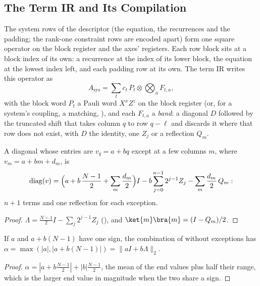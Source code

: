 \subsection{The Term IR and Its Compilation}
\label{app:term-ir}

The system rows of the descriptor (the equation, the recurrences and the padding; the rank-one constraint rows are encoded apart) form one square operator on the block register and the axes' registers. Each row block sits at a block index of its own: a recurrence at the index of its lower block, the equation at the lowest index left, and each padding row at its own. The term IR writes this operator as
\begin{equation}
    A_{\mathrm{sys}}=\sum_tc_t\,P_t\otimes\bigotimes_aF_{t,a},
    \label{eq:app-term-ir}
\end{equation}
with the block word $P_t$ a Pauli word $X^xZ^z$ on the block register (or, for a system's coupling, a matching, ), and each $F_{t,a}$ a \emph{band}: a diagonal $D$ followed by the truncated shift that takes column $q$ to row $q-\ell$ and discards it where that row does not exist, with $D$ the identity, one $Z_j$ or a reflection $Q_m$.

\begin{lemma}
\label{lem:affine-band}
A diagonal whose entries are $v_q=a+bq$ except at a few columns $m$, where $v_m=a+bm+d_m$, is
\begin{equation*}
    \operatorname{diag}(v)=\Bigl(a+b\,\frac{N-1}{2}+\sum_m\frac{d_m}{2}\Bigr)I-b\sum_{j=0}^{n-1}2^{j-1}Z_j-\sum_m\frac{d_m}{2}\,Q_m :
\end{equation*}
$n+1$ terms and one reflection for each exception.
\end{lemma}
\begin{proof}
$\Lambda=\tfrac{N-1}{2}I-\sum_j2^{j-1}Z_j$ (), and $\ket{m}\bra{m}=(I-Q_m)/2$.
\end{proof}

\begin{lemma}
\label{lem:affine-tight}
If $a$ and $a+b(N-1)$ have one sign, the combination of  without exceptions has $\alpha=\max(|a|,|a+b(N-1)|)=\|aI+b\Lambda\|_2$.
\end{lemma}
\begin{proof}
$\alpha=|a+b\tfrac{N-1}{2}|+|b|\tfrac{N-1}{2}$, the mean of the end values plus half their range, which is the larger end value in magnitude when the two share a sign.
\end{proof}

